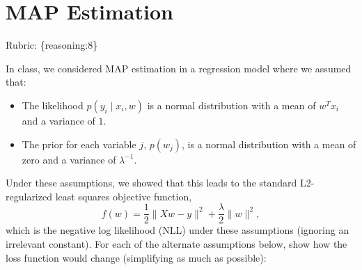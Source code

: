 \documentclass{article}
\def\rubric#1{\gre{Rubric: \{#1\}}}{}
\def\blu#1{{\color{blu}#1}}
\def\gre#1{{\color{gre}#1}}
\def\norm#1{\|#1\|}
\def\items#1{\begin{itemize}#1\end{itemize}}
\begin{document}
\section{MAP Estimation}
\rubric{reasoning:8}

In class, we considered MAP estimation in a regression model where we assumed that:
\items{
\item The likelihood $p(y_i \mid x_i, w)$ is a normal distribution with a mean of $w^Tx_i$ and a variance of $1$.
\item The prior for each variable $j$, $p(w_j)$, is a normal distribution with a mean of zero and a variance of $\lambda^{-1}$.
}
Under these assumptions, we showed that this leads to the standard L2-regularized least squares objective function,
\[
f(w) = \frac{1}{2}\norm{Xw - y}^2 + \frac \lambda 2 \norm{w}^2,
\]
which is the negative log likelihood (NLL) under these assumptions (ignoring an irrelevant constant).
\blu{For each of the alternate assumptions below, show how the loss function would change} (simplifying as much as possible):
\end{document}
